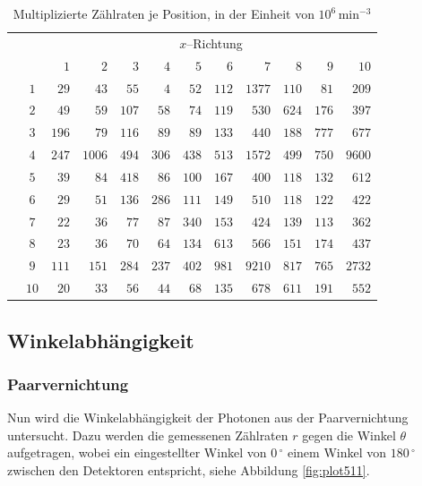 \documentclass[12pt,a4paper]{scrartcl}
\numberwithin{equation}{section} %
\begin{document}
\begin{table}
	\vspace{24pt}
	\begin{tabular}{cc|rrrrrrrrrr}
		 && \multicolumn{10}{c}{$x$--Richtung} \\
		 && $1$ & $2$ & $3$ & $4$ & $5$ & $6$ & $7$ & $8$ & $9$ & $10$ \\
		 \hline
		\multirow{10}{*}{\rotatebox{90}{$y$--Richtung}} &$1$  & $29$ & $43$ & $55$ & $4$ & $52$ & $112$ & $1377$ & $110$ & $81$ & $209$ \\
		&$2$  & $49$ & $59$ & $107$ & $58$ & $74$ & $119$ & $530$ & $624$ & $176$ & $397$ \\
		&$3$  & $196$ & $79$ & $116$ & $89$ & $89$ & $133$ & $440$ & $188$ & $777$ & $677$ \\
		&$4$  & $247$ & $1006$ & $494$ & $306$ & $438$ & $513$ & $1572$ & $499$ & $750$ & $9600$ \\
		&$5$  & $39$ & $84$ & $418$ & $86$ & $100$ & $167$ & $400$ & $118$ & $132$ & $612$ \\
		&$6$  & $29$ & $51$ & $136$ & $286$ & $111$ & $149$ & $510$ & $118$ & $122$ & $422$ \\
		&$7$  & $22$ & $36$ & $77$ & $87$ & $340$ & $153$ & $424$ & $139$ & $113$ & $362$ \\
		&$8$  & $23$ & $36$ & $70$ & $64$ & $134$ & $613$ & $566$ & $151$ & $174$ & $437$ \\
		&$9$  & $111$ & $151$ & $284$ & $237$ & $402$ & $981$ & $9210$ & $817$ & $765$ & $2732$ \\
		&$10$  & $20$ & $33$ & $56$ & $44$ & $68$ & $135$ & $678$ & $611$ & $191$ & $552$ \\
	\end{tabular}
	\caption{Multiplizierte Zählraten je Position, in der Einheit von $10^6\, \mathrm{min^{-3}}$}
	\label{tab:PET Matrix}
\end{table}

\clearpage
\hypertarget{winkelabhuxe4ngigkeit}{\subsection{Winkelabhängigkeit}\label{winkelabhuxe4ngigkeit}}

\subsubsection{Paarvernichtung}
\label{auswertung-paarvernichtung}
Nun wird die Winkelabhängigkeit der Photonen aus der Paarvernichtung untersucht. Dazu werden die gemessenen Zählraten $r$ gegen die Winkel $\theta$ aufgetragen, wobei ein eingestellter Winkel von $0\,^\circ$ einem Winkel von $180\,^\circ$ zwischen den Detektoren entspricht, siehe Abbildung \ref{fig:plot511}.
\end{document}
